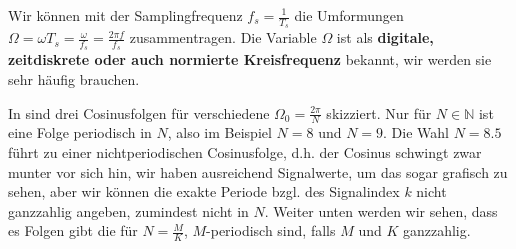 Wir können mit der Samplingfrequenz $f_s=\frac{1}{T_s}$ die Umformungen
$\Omega = \omega T_s = \frac{\omega}{f_s} = \frac{2\pi f}{f_s}$
zusammentragen. Die Variable $\Omega$ ist als \textbf{digitale, zeitdiskrete oder auch
normierte Kreisfrequenz} bekannt, wir werden sie sehr häufig brauchen.

In  sind drei Cosinusfolgen für verschiedene
$\Omega_0=\frac{2\pi}{N}$ skizziert.
%
Nur für $N\in\mathbb{N}$ ist eine Folge periodisch in $N$, also
im Beispiel $N=8$ und $N=9$. Die Wahl $N=8.5$ führt zu einer nichtperiodischen
Cosinusfolge, d.h. der Cosinus schwingt zwar munter vor sich hin, wir haben
ausreichend Signalwerte, um das sogar grafisch zu sehen, aber wir
können die exakte Periode bzgl. des Signalindex $k$ nicht ganzzahlig angeben,
zumindest nicht in $N$. Weiter unten werden wir sehen, dass es Folgen gibt
die für $N=\frac{M}{K}$, $M$-periodisch sind, falls $M$ und $K$ ganzzahlig.

